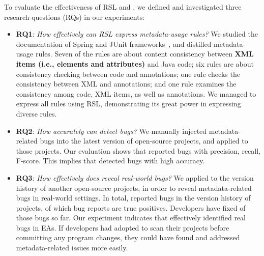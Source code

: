 {To evaluate the effectiveness of RSL and \tool, we defined and investigated three research questions (RQs) in our experiments:
\begin{itemize}
\item \textbf{RQ1}: \emph{How effectively can RSL express metadata-usage rules?} We studied the documentation of Spring and JUnit frameworks~\cite{spring-doc,spring-tutorial,JUnit5}, and distilled \totalRule metadata-usage rules. 
Seven of the rules are about content consistency between \textbf{XML items (i.e., elements and attributes)} and Java code; six rules are about consistency checking between code and  annotations; one rule checks the consistency between XML and annotations; 
and one rule examines the consistency among code, XML items, as well as annotations. %
{We managed to express all rules using RSL, demonstrating its great power in expressing diverse rules.}
\item \textbf{RQ2}: \emph{How accurately can \tool detect bugs?} We manually injected \totalInjection metadata-related bugs into the latest version of \totalInjectedProject open-source projects, 
and applied \tool to those projects. Our evaluation shows that
\tool reported bugs with \precision precision, \recall recall, \fscore F-score. This implies that \tool detected bugs with high accuracy. 
\item \textbf{RQ3}: \emph{How effectively does \tool reveal real-world bugs?} We applied \tool to the version history of another \totalRealProject open-source projects, in order to reveal metadata-related bugs in real-world settings. 
{In total, \tool reported \totalReportedInReal bugs in the version history of \totalInterestingEAs projects, \totalInteresting of which bug reports are true positives.} 
Developers have fixed \totalRealBugs of those bugs so far. 
Our experiment indicates that \tool effectively identified real bugs in EAs. 
If developers had adopted \tool to scan their projects before committing any program changes, they could have found and addressed metadata-related issues more easily. 
\end{itemize}
}


